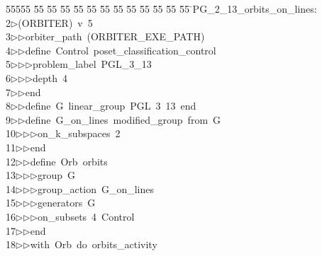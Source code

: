 %
%
\begin{tabbing}
55555 \= 55 \= 55 \= 55 \= 55 \= 55 \= 55 \= 55 \= 55 \= 55 \= 55 \= 55 \= 55 \= \>PG\_2\_13\_orbits\_on\_lines:\\[0pt]
2\>$\triangleright$\>(ORBITER)\ v\ 5\ \\[0pt]
3\>$\triangleright$\>$\triangleright$\>orbiter\_path\ (ORBITER\_EXE\_PATH)\ \\[0pt]
4\>$\triangleright$\>$\triangleright$\>define\ Control\ poset\_classification\_control\ \\[0pt]
5\>$\triangleright$\>$\triangleright$\>$\triangleright$\>problem\_label\ PGL\_3\_13\ \\[0pt]
6\>$\triangleright$\>$\triangleright$\>$\triangleright$\>depth\ 4\ \\[0pt]
7\>$\triangleright$\>$\triangleright$\>end\ \\[0pt]
8\>$\triangleright$\>$\triangleright$\>define\ G\ linear\_group\ PGL\ 3\ 13\ end\ \\[0pt]
9\>$\triangleright$\>$\triangleright$\>define\ G\_on\_lines\ modified\_group\ from\ G\ \\[0pt]
10\>$\triangleright$\>$\triangleright$\>$\triangleright$\>on\_k\_subspaces\ 2\ \\[0pt]
11\>$\triangleright$\>$\triangleright$\>end\ \\[0pt]
12\>$\triangleright$\>$\triangleright$\>define\ Orb\ orbits\ \\[0pt]
13\>$\triangleright$\>$\triangleright$\>$\triangleright$\>group\ G\ \\[0pt]
14\>$\triangleright$\>$\triangleright$\>$\triangleright$\>group\_action\ G\_on\_lines\ \\[0pt]
15\>$\triangleright$\>$\triangleright$\>$\triangleright$\>generators\ G\ \\[0pt]
16\>$\triangleright$\>$\triangleright$\>$\triangleright$\>on\_subsets\ 4\ Control\ \\[0pt]
17\>$\triangleright$\>$\triangleright$\>end\ \\[0pt]
18\>$\triangleright$\>$\triangleright$\>with\ Orb\ do\ orbits\_activity\ \\[0pt]

\end{tabbing}
